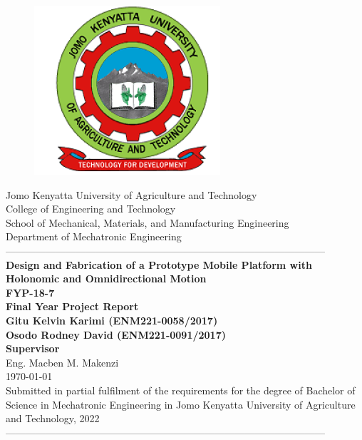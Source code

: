 \documentclass[12pt,fleqn]{article}
\begin{document}
\begin{titlepage}
  \begin{center}
      \vspace*{-4.0cm}
    \begin{figure}[!h]
\centering
\includegraphics[width=0.3\linewidth]{Figures/JKUAT_logo}
\label{fig:jomologo}
\end{figure}
   \large{Jomo Kenyatta University of Agriculture and Technology}\\
    \large{College of Engineering and Technology}\\
    \large{School of Mechanical, Materials, and Manufacturing Engineering}\\
   \large{Department of Mechatronic Engineering}\\
    ------------------------------------------------------------------------------------------------\\
    \LARGE{\textbf{Design and Fabrication of a Prototype Mobile Platform with Holonomic and Omnidirectional Motion}}\\[0.5cm]
    \LARGE{\textbf{FYP-18-7}}\\[0.1cm]
    \LARGE{\textbf {Final Year Project Report}}\\[0.1cm]
    \vspace{0.2cm}
    \large{\textbf{Gitu Kelvin Karimi (ENM221-0058/2017)}}\\
    \large{\textbf{Osodo Rodney David (ENM221-0091/2017)}}\\[0.3cm]
    \large{\textbf{Supervisor}}\\
    \large{Eng. Macben M. Makenzi}\\[0.2cm]
    \large{\small{\monthyeardate\today}}\\
    \large{\small{Submitted in partial fulfilment of the requirements for the degree of Bachelor of Science in Mechatronic Engineering in Jomo Kenyatta University of Agriculture and Technology, 2022}}
    ------------------------------------------------------------------------------------------------\\[1.0cm]
  \end{center}
\end{titlepage}
\end{document}
